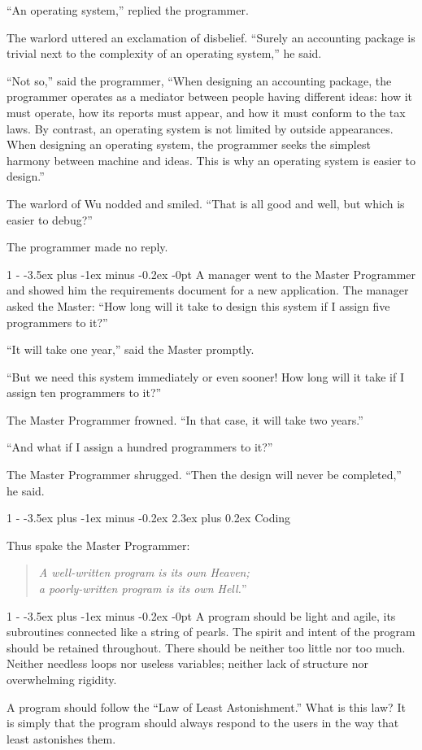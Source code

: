 \documentclass[12pt,letterpaper,titlepage]{article}
\makeatletter
\newlength{\intomargin}\setlength{\intomargin}{25pt}
\renewcommand{\section}{%
\@startsection{section}%
{1}%
{-\intomargin}%
{-3.5ex plus -1ex minus -0.2ex}%
{2.3ex plus 0.2ex}%
{\clearpage\normalfont\Large\bfseries\color{my-red}}%
}
\renewcommand{\subsection}{%
\@startsection{subsection}%
{1}%
{-\intomargin}%
{-3.5ex plus -1ex minus -0.2ex}%
{-0pt}%
{\normalfont\normalsize\bfseries\color{my-red}}%
}
\newcommand{\book}[2]{\section{#1}%
\par\hspace{-\intomargin}Thus spake the Master Programmer:%
\begin{quotation}\color{my-gray}\noindent\llap{``}\textsl{#2}''\end{quotation}\medskip}
\newcommand{\sect}{\subsection{}}
\makeatother
\begin{document}
``An operating system,'' replied the programmer.

The warlord uttered an exclamation of disbelief. ``Surely an
accounting package is trivial next to the complexity of an operating
system,'' he said.

``Not so,'' said the programmer, ``When designing an accounting
package, the programmer operates as a mediator between people having
different ideas: how it must operate, how its reports must appear, and
how it must conform to the tax laws. By contrast, an operating system
is not limited by outside appearances. When designing an operating
system, the programmer seeks the simplest harmony between machine and
ideas. This is why an operating system is easier to design.''

The warlord of Wu nodded and smiled. ``That is all good and well, but
which is easier to debug?''

The programmer made no reply.

\sect
A manager went to the Master Programmer and showed him the
requirements document for a new application. The manager asked the
Master: ``How long will it take to design this system if I assign five
programmers to it?''

``It will take one year,'' said the Master promptly.

``But we need this system immediately or even sooner! How long will it
take if I assign ten programmers to it?''

The Master Programmer frowned. ``In that case, it will take two years.''

``And what if I assign a hundred programmers to it?''

The Master Programmer shrugged. ``Then the design will never be
completed,'' he said.

\book{Coding}%
{A well-written program is its own Heaven;\\ a poorly-written
program is its own Hell.}

\sect
A program should be light and agile, its subroutines connected like a
string of pearls. The spirit and intent of the program should be
retained throughout. There should be neither too little nor too
much. Neither needless loops nor useless variables; neither lack of
structure nor overwhelming rigidity.

A program should follow the ``Law of Least Astonishment.'' What is
this law? It is simply that the program should always respond to the
users in the way that least astonishes them.
\end{document}
